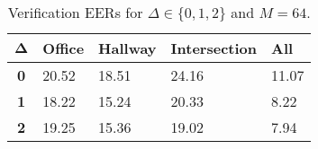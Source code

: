 \begin{table}[h]
    \centering
    \begin{tabular}{|c|M{2cm}|M{2cm}|M{2cm}|M{2cm}|}
    \hline
    $\boldsymbol{\Delta}$ & \bf{Office} & \bf{Hallway} & \bf{Intersection} & \bf{All} \\ 
    \hline 
    \hline
    \bf{0} & 20.52 & 18.51 & 24.16 & 11.07 \\
    \hline
    \bf{1} & 18.22 & 15.24 & 20.33 & 8.22 \\
    \hline
    \bf{2} & 19.25 & 15.36 & 19.02 & 7.94 \\
    \hline
    \end{tabular}
    \caption{Verification EERs for $\Delta \in \{0, 1, 2\}$ and $M = 64$.}
    \label{tab:verify_adapted_mv_M_64}
\end{table}
